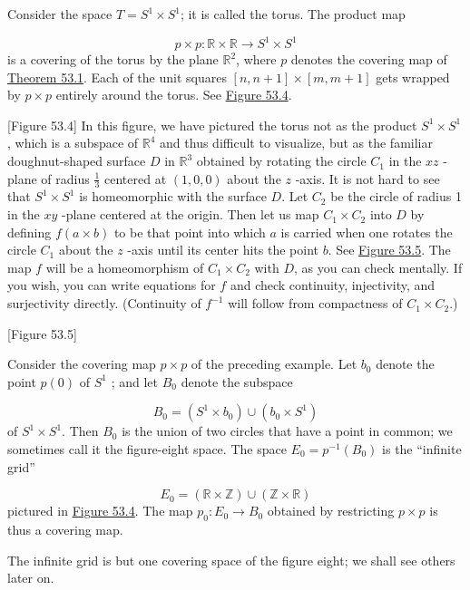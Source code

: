 \begin{centeredblock*}
\begin{example}
\label{ex:\thesection.\theexample}
Consider the space \(T = S^{1} \times {S}^{1}\); it is called the torus. The product map

\[
p \times p : \mathbb{R} \times \mathbb{R} \rightarrow {S}^{1} \times {S}^{1}
\]
is a covering of the torus by the plane \(\mathbb{R}^{2}\), where \(p\) denotes the covering map of \hyperref[thm:53.1]{Theorem 53.1}. Each of the unit squares \([ {n,n + 1}] \times [ {m,m + 1}]\) gets wrapped by \(p \times p\) entirely around the torus. See \hyperref[fig:53.4]{Figure 53.4}.

[Figure 53.4]
In this figure, we have pictured the torus not as the product \(S^{1} \times {S}^{1}\), which is a subspace of \(\mathbb{R}^{4}\) and thus difficult to visualize, but as the familiar doughnut-shaped surface \(D\) in \(\mathbb{R}^{3}\) obtained by rotating the circle \(C_{1}\) in the \({xz}\) -plane of radius \(\frac{1}{3}\) centered at \((1,0,0)\) about the \(z\) -axis. It is not hard to see that \(S^{1} \times {S}^{1}\) is homeomorphic with the surface \(D\). Let \(C_{2}\) be the circle of radius 1 in the \({xy}\) -plane centered at the origin. Then let us map \(C_{1} \times {C}_{2}\) into \(D\) by defining \(f( {a \times b})\) to be that point into which \(a\) is carried when one rotates the circle \(C_{1}\) about the \(z\) -axis until its center hits the point \(b\). See \hyperref[fig:53.5]{Figure 53.5}. The map \(f\) will be a homeomorphism of \(C_{1} \times {C}_{2}\) with \(D\), as you can check mentally. If you wish, you can write equations for \(f\) and check continuity, injectivity, and surjectivity directly. (Continuity of \(f^{-1}\) will follow from compactness of \(C_{1} \times {C}_{2}\).)

[Figure 53.5]
\end{example}
\end{centeredblock*}

\begin{centeredblock*}
\begin{example}
\label{ex:\thesection.\theexample}
Consider the covering map \(p \times p\) of the preceding example. Let \(b_{0}\) denote the point \(p( 0)\) of \(S^{1}\) ; and let \(B_{0}\) denote the subspace

\[
B_{0} = ( {S^{1} \times {b}_{0}}) \cup ( {b_{0} \times {S}^{1}})
\]
of \(S^{1} \times {S}^{1}\). Then \(B_{0}\) is the union of two circles that have a point in common; we sometimes call it the figure-eight space. The space \(E_{0} = p^{-1}( B_{0})\) is the ``infinite grid''

\[
E_{0} = ( {\mathbb{R} \times \mathbb{Z}}) \cup ( {\mathbb{Z} \times \mathbb{R}})
\]
pictured in \hyperref[fig:53.4]{Figure 53.4}. The map \(p_{0} : E_{0} \rightarrow {B}_{0}\) obtained by restricting \(p \times p\) is thus a covering map.

The infinite grid is but one covering space of the figure eight; we shall see others later on.

\end{example}
\end{centeredblock*}

